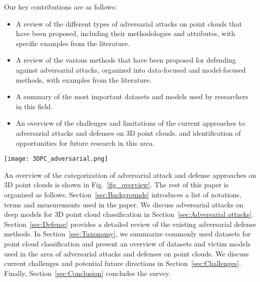 \documentclass{ieeeaccess}
\begin{document}



Our key contributions are as follows:


\begin{itemize}
\item  A review of the different types of adversarial attacks on point clouds that have been proposed, including their methodologies and attributes, with specific examples from the literature. %
\item A review of the various methods that have been proposed for defending against adversarial attacks, organized into data-focused and model-focused methods, with examples from the literature. %
\item A summary of the most important datasets and models used by researchers in this field.
\item An overview %
of the challenges and limitations of the current approaches to adversarial attacks and defenses on 3D point clouds, and identification of opportunities for future research in this area.
\end{itemize}

\begin{figure*}[t]
    \centering
    \texttt{[image: 3DPC\_adversarial.png]}
    \caption{%
    Categorization of adversarial attack and defense approaches on 3D point clouds.}
    \label{fig_overview}
\end{figure*}


An overview of the categorization of adversarial attack and defense approaches on 3D point clouds is shown in 
Fig.~\ref{fig_overview}. The rest of this paper is organized as follows. Section~\ref{sec:Backgrounds} introduces a list of notations, terms and measurements used in the paper. We discuss adversarial attacks on deep models for 3D point cloud classification %
in Section~\ref{sec:Adversarial attacks}. Section~\ref{sec:Defense} provides a detailed review of the existing adversarial defense methods. In Section~\ref{sec:Taxonomy}, we summarize commonly used datasets for point cloud classification and present an overview %
of datasets and victim models used in %
the area of adversarial attacks and defenses on point clouds. We discuss current challenges and potential future directions in Section~\ref{sec:Challenges}. Finally, Section~\ref{sec:Conclusion} concludes the survey.
\end{document}
